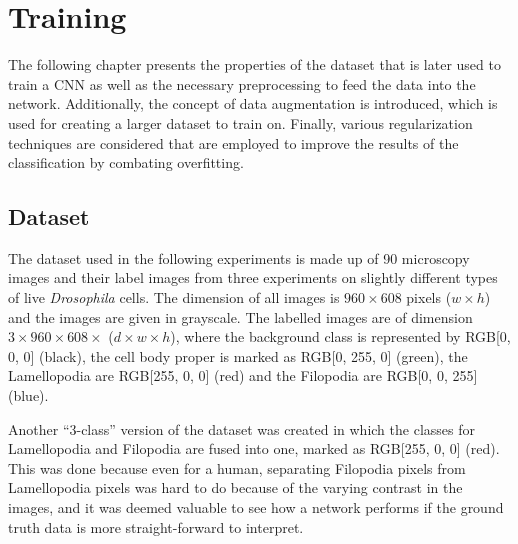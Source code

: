 \chapter{Training}
\label{chap:training}

The following chapter presents the properties of the dataset that is later used to train a CNN as well as the necessary preprocessing to feed the data into the network. Additionally, the concept of data augmentation is introduced, which is used for creating a larger dataset to train on. Finally, various regularization techniques are considered that are employed to improve the results of the classification by combating overfitting.

	\section{Dataset}
The dataset used in the following experiments is made up of 90 microscopy images and their label images from three experiments on slightly different types of live \textit{Drosophila} cells. The dimension of all images is $960 \times 608$ pixels ($w \times h$) and the images are given in grayscale. The labelled images are of dimension $3 \times 960 \times 608 \times$ ($d \times w \times h$), where the background class is represented by RGB[0, 0, 0] (black), the cell body proper is marked as RGB[0, 255, 0] (green), the Lamellopodia are RGB[255, 0, 0] (red) and the Filopodia are RGB[0, 0, 255] (blue).

Another ``3-class'' version of the dataset was created in which the classes for Lamellopodia and Filopodia are fused into one, marked as RGB[255, 0, 0] (red). This was done because even for a human, separating Filopodia pixels from Lamellopodia pixels was hard to do because of the varying contrast in the images, and it was deemed valuable to see how a network performs if the ground truth data is more straight-forward to interpret.\\

